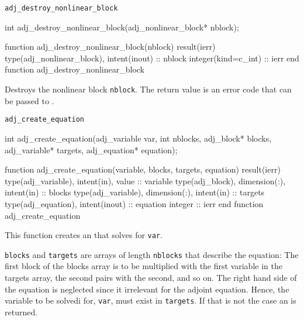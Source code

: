 \begin{boxwithtitle}{\texttt{adj_destroy_nonlinear_block}}
\begin{minipage}{\columnwidth}
\begin{ccode}
  int adj_destroy_nonlinear_block(adj_nonlinear_block* nblock);
\end{ccode}
\begin{fortrancode}
  function adj_destroy_nonlinear_block(nblock) result(ierr)
    type(adj_nonlinear_block), intent(inout) :: nblock
    integer(kind=c_int) :: ierr
  end function adj_destroy_nonlinear_block
\end{fortrancode}
\end{minipage}
\end{boxwithtitle}
Destroys the nonlinear block \texttt{nblock}.
The return value is an error code that can be passed to .


\begin{boxwithtitle}{\texttt{adj_create_equation}}
\begin{minipage}{\columnwidth}
\begin{ccode}
  int adj_create_equation(adj_variable var, int nblocks, adj_block* blocks, 
                          adj_variable* targets, adj_equation* equation);
\end{ccode}
\begin{fortrancode}
  function adj_create_equation(variable, blocks, targets, equation) result(ierr)
    type(adj_variable), intent(in), value :: variable
    type(adj_block), dimension(:), intent(in) :: blocks
    type(adj_variable), dimension(:), intent(in) :: targets
    type(adj_equation), intent(inout) :: equation
    integer :: ierr
  end function adj_create_equation
\end{fortrancode}
\end{minipage}
\end{boxwithtitle}
This function creates an  that solves for \texttt{var}.

\texttt{blocks} and \texttt{targets} are arrays of length \texttt{nblocks} that describe the equation:
The first block of the blocks array is to be multiplied with the first variable in the targets array, 
the second pairs with the second, and so on.
The right hand side of the equation is neglected since it irrelevant for the adjoint equation. 
Hence, the variable to be solvedi for, \texttt{var}, must exist in \texttt{targets}. If that is not the case an  is returned.
 

